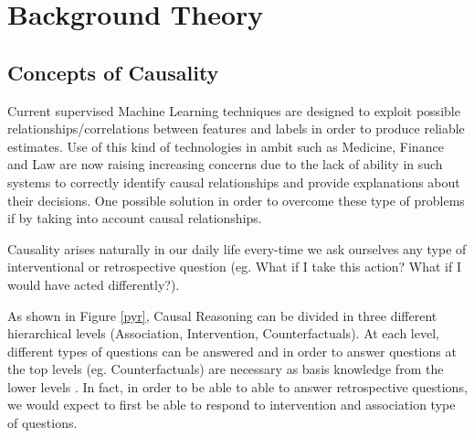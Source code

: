 \chapter{Background Theory}

  
\newenvironment{conditions}[1][where:]
  {#1 \begin{tabular}[t]{>{$}l<{$} @{${}={}$} l}}
  {\end{tabular}\\[\belowdisplayskip]}

\label{ch:background}

\section{Concepts of Causality}

Current supervised Machine Learning techniques are designed to exploit possible relationships/correlations between features and labels in order to produce reliable estimates. Use of this kind of technologies in ambit such as Medicine, Finance and Law are now raising increasing concerns due to the lack of ability in such systems to correctly identify causal relationships and provide explanations about their decisions. One possible solution in order to overcome these type of problems if by taking into account causal relationships.

Causality arises naturally in our daily life every-time we ask ourselves any type of interventional or retrospective question (eg. What if I take this action? What if I would have acted differently?).

As shown in Figure \ref{pyr}, Causal Reasoning can be divided in three different hierarchical levels (Association, Intervention, Counterfactuals). At each level, different types of questions can be answered and in order to answer questions at the top levels (eg. Counterfactuals) are necessary as basis knowledge from the lower levels \cite{tools}. In fact, in order to be able to able to answer retrospective questions, we would expect to first be able to respond to intervention and association type of questions.

